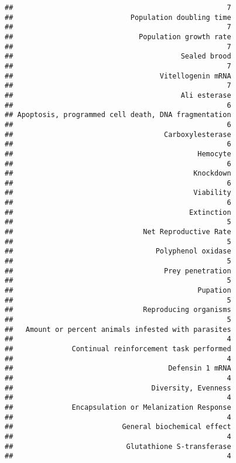 \documentclass[]{article}
\begin{document}
\begin{verbatim}
##                                                   7 
##                            Population doubling time 
##                                                   7 
##                              Population growth rate 
##                                                   7 
##                                        Sealed brood 
##                                                   7 
##                                   Vitellogenin mRNA 
##                                                   7 
##                                        Ali esterase 
##                                                   6 
## Apoptosis, programmed cell death, DNA fragmentation 
##                                                   6 
##                                    Carboxylesterase 
##                                                   6 
##                                            Hemocyte 
##                                                   6 
##                                           Knockdown 
##                                                   6 
##                                           Viability 
##                                                   6 
##                                          Extinction 
##                                                   5 
##                               Net Reproductive Rate 
##                                                   5 
##                                  Polyphenol oxidase 
##                                                   5 
##                                    Prey penetration 
##                                                   5 
##                                            Pupation 
##                                                   5 
##                               Reproducing organisms 
##                                                   5 
##   Amount or percent animals infested with parasites 
##                                                   4 
##              Continual reinforcement task performed 
##                                                   4 
##                                     Defensin 1 mRNA 
##                                                   4 
##                                 Diversity, Evenness 
##                                                   4 
##              Encapsulation or Melanization Response 
##                                                   4 
##                          General biochemical effect 
##                                                   4 
##                           Glutathione S-transferase 
##                                                   4 

\end{verbatim}
\end{document}
